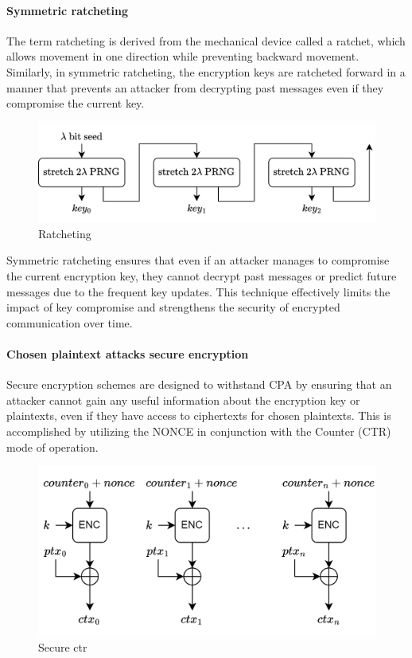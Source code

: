 \paragraph*{Symmetric ratcheting}
The term ratcheting is derived from the mechanical device called a ratchet, which allows movement in one direction while preventing backward movement. 
Similarly, in symmetric ratcheting, the encryption keys are ratcheted forward in a manner that prevents an attacker from decrypting past messages even if they compromise the current key.
\begin{figure}[H]
    \centering
    \includegraphics[width=0.75\linewidth]{images/ratchet.png}
    \caption{Ratcheting}
\end{figure}
Symmetric ratcheting ensures that even if an attacker manages to compromise the current encryption key, they cannot decrypt past messages or predict future messages due to the frequent key updates. 
This technique effectively limits the impact of key compromise and strengthens the security of encrypted communication over time.

\paragraph*{Chosen plaintext attacks secure encryption}
Secure encryption schemes are designed to withstand CPA by ensuring that an attacker cannot gain any useful information about the encryption key or plaintexts, even if they have access to ciphertexts for chosen plaintexts.
This is accomplished by utilizing the NONCE in conjunction with the Counter (CTR) mode of operation.
\begin{figure}[H]
    \centering
    \includegraphics[width=0.75\linewidth]{images/sctr.png}
    \caption{Secure ctr}
\end{figure}